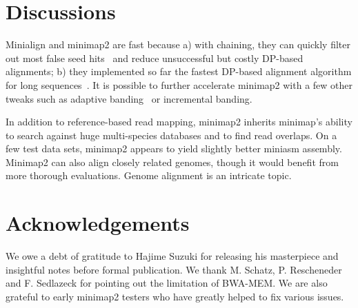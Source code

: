\documentclass{bioinfo}
\begin{document}
\section{Discussions}

Minialign and minimap2 are fast because a) with chaining, they can quickly
filter out most false seed hits~\citep{Li:2016aa} and reduce unsuccessful but
costly DP-based alignments; b) they implemented so far the fastest DP-based
alignment algorithm for long sequences~\citep{Suzuki:2016}. It is possible to
further accelerate minimap2 with a few other tweaks such as adaptive
banding~\citep{Suzuki130633} or incremental banding.

In addition to reference-based read mapping, minimap2 inherits minimap's
ability to search against huge multi-species databases and to find read
overlaps. On a few test data sets, minimap2 appears to yield slightly better
miniasm assembly. Minimap2 can also align closely related genomes, though it
would benefit from more thorough evaluations. Genome alignment is an intricate
topic.

\section*{Acknowledgements}
We owe a debt of gratitude to Hajime Suzuki for releasing his masterpiece and
insightful notes before formal publication. We thank M. Schatz, P. Rescheneder
and F.  Sedlazeck for pointing out the limitation of BWA-MEM. We are also
grateful to early minimap2 testers who have greatly helped to fix various
issues.



\appendix
\end{document}
